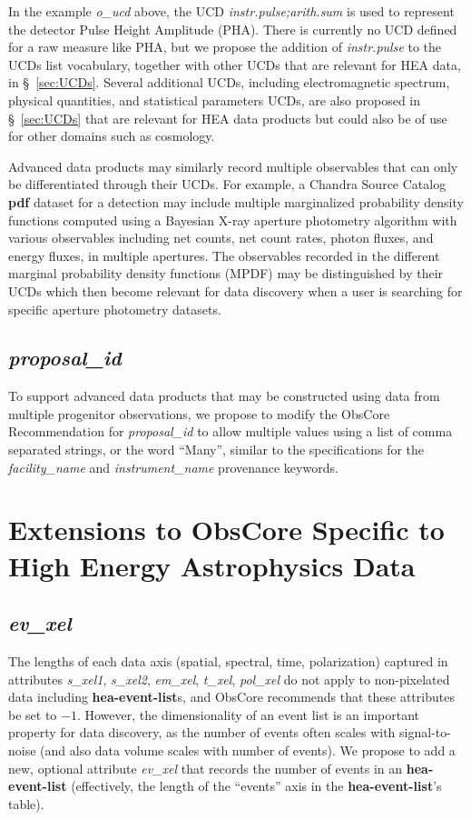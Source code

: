 \documentclass[11pt,a4paper]{ivoa}
\begin{document}
In the example {\em o\_ucd\/} above, the UCD {\em instr.pulse;arith.sum\/} is used to represent the detector Pulse Height Amplitude (PHA)\null. There is currently no UCD defined for a raw measure like PHA, but we propose the addition of {\em instr.pulse\/} to the UCDs list vocabulary, together with other UCDs that are relevant for \gls{HEA} data, in \S~\ref{sec:UCDs}.  Several additional UCDs, including electromagnetic spectrum, physical quantities, and statistical parameters UCDs, are also proposed in \S~\ref{sec:UCDs} that are relevant for \gls{HEA} data products but could also be of use for other domains such as cosmology.

Advanced data products may similarly record multiple observables that can only be differentiated through their UCDs. For example, a Chandra Source Catalog {\bf pdf} dataset for a detection may include multiple marginalized probability density functions computed using a Bayesian X-ray aperture photometry algorithm with various observables including net counts, net count rates, photon fluxes, and energy fluxes, in multiple apertures.  The observables recorded in the different marginal probability density functions (MPDF) may be distinguished by their UCDs which then become relevant for data discovery when a user is searching for specific aperture photometry datasets.


\subsection{{\em proposal\_id}}

To support advanced data products that may be constructed using data from multiple progenitor observations, we propose to modify the ObsCore Recommendation for {\em proposal\_id\/} to allow multiple values using a list of comma separated strings, or the word ``Many'', similar to the specifications for the {\em facility\_name\/} and {\em instrument\_name\/} provenance keywords. 


\pagebreak
\section{Extensions to ObsCore Specific to High Energy Astrophysics Data}
\label{sec:obscoreext}

\subsection{{\em ev\_xel}}

The lengths of each data axis (spatial, spectral, time, polarization) captured in attributes {\em s\_xel1\/}, {\em s\_xel2\/}, {\em em\_xel\/}, {\em t\_xel\/}, {\em pol\_xel\/} do not apply to non-pixelated data including {\bf hea-event-list}s, and ObsCore recommends that these attributes be set to $-1$.  However, the dimensionality of an event list is an important property for data discovery, as the number of events often scales with signal-to-noise (and also data volume scales with number of events).  We propose to add a new, optional attribute {\em ev\_xel\/} that records the number of events in an {\bf hea-event-list} (effectively, the length of the ``events'' axis in the {\bf hea-event-list}'s table).
\end{document}
